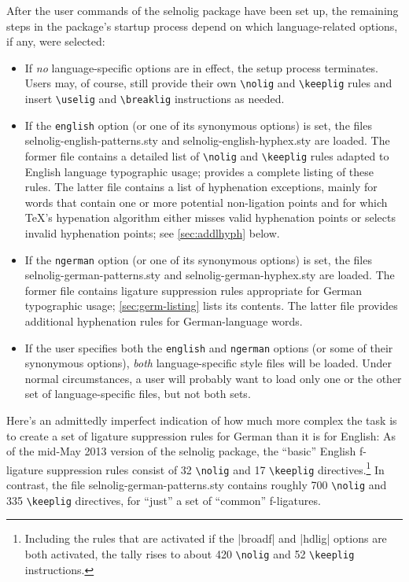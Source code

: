 \documentclass[11pt]{article}
\newcommand{\pkg}[1]{\textsf{#1}}
\newcommand{\opt}[1]{\texttt{#1}}
\newcommand{\cmmd}[1]{\texttt{\textbackslash #1}}
\begin{document}
After the user commands of the \pkg{selnolig} package have been set up, the remaining steps in the package's startup process depend on which language-related options, if any, were selected:
\begin{itemize}
\item If \emph{no} language-specific options are in effect, the setup process terminates. Users may, of course, still provide their own \cmmd{nolig} and \cmmd{keeplig} rules and insert \cmmd{uselig} and \cmmd{breaklig} instructions as needed.

\item If the \opt{english} option (or one of its synonymous options) is set, the files \pkg{selnolig-english-patterns.sty} and \pkg{selnolig-english-hyphex.sty} are loaded. The former file contains a detailed list of \cmmd{nolig} and \cmmd{keeplig} rules adapted to English language typographic usage;  provides a complete listing of these rules. The latter file contains a list of hyphenation exceptions, mainly for words that contain one or more potential non-ligation points and for which \TeX's hypenation algorithm either misses valid hyphenation points or selects invalid hyphenation points; see \cref{sec:addlhyph} below.

\item If the \opt{ngerman} option (or one of its synonymous options) is set, the files \pkg{selnolig-german-patterns.sty} and \pkg{selnolig-german-hyphex.sty} are loaded. The former file contains ligature suppression rules appropriate for German typographic usage; \cref{sec:germ-listing} lists its contents. The latter file provides additional hyphenation rules for German-language words.

\item If the user specifies both the \opt{english} and \opt{ngerman} options (or some of their synonymous options), \emph{both} language-specific style files will be loaded. Under normal circumstances, a user will probably want to load only one or the other set of language-specific files, but not both sets.
\end{itemize}

Here's an admittedly imperfect indication of how much more complex the task is to create a set of ligature suppression rules for German than it is for English: As of the mid-May 2013 version of the \pkg{selnolig} package, the \enquote{basic} English f-ligature suppression rules consist of 32 \cmmd{nolig} and 17 \cmmd{keeplig} directives.\footnote{Including the rules that are activated if the |broadf| and |hdlig| options are both activated, the tally rises to about 420 \cmmd{nolig} and 52 \cmmd{keeplig} instructions.} In contrast, the file \pkg{selnolig-german-patterns.sty} contains roughly 700 \cmmd{nolig} and 335 \cmmd{keeplig} directives, for \enquote{just} a set of \enquote{common} f-ligatures.
\end{document}
